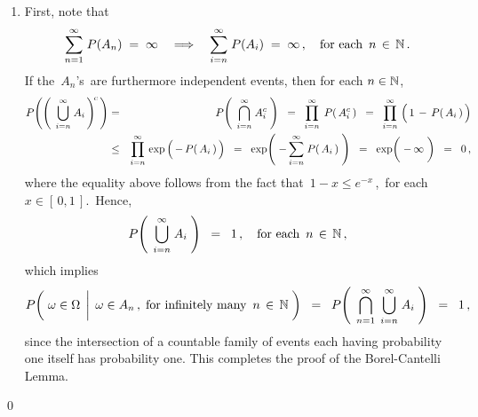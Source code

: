 \begin{enumerate}
\item
	First, note that
	\begin{equation*}
	\overset{\infty}{\underset{n=1}{\sum}}\;P(A_{n}) \; = \; \infty
	\quad\Longrightarrow\quad
		\overset{\infty}{\underset{i=n}{\sum}}\;P(A_{i}) \; = \; \infty\,,
	\quad\textnormal{for each \,$n \,\in\, \mathbb{N}$}\,.
	\end{equation*}
	If the \,$A_{n}$'s\, are furthermore independent events, then for each $n \in \mathbb{N}$,
	\begin{eqnarray*}
	P\!\left(\left(\;\,\overset{\infty}{\underset{i=n}{\bigcup}}\;A_{i}\,\right)^{\!c}\,\right)
	& = &
		P\!\left(\;\,\overset{\infty}{\underset{i=n}{\bigcap}}\;A_{i}^{c}\;\right)
		\;\; = \;\;
			\overset{\infty}{\underset{i=n}{\prod}}\;\, P\!\left(\,A_{i}^{c}\,\right)
		\;\; = \;\;
			\overset{\infty}{\underset{i=n}{\prod}}\, \left(\,\overset{{\color{white}.}}{1} \,-\, P\!\left(\,A_{i}\,\right)\,\right)
	\\
	& \leq &
		\overset{\infty}{\underset{i=n}{\prod}}\, \exp\left(\, -\,\overset{{\color{white}.}}{P}\!\left(\,A_{i}\,\right)\,\right)
		\;\; = \;\;
			\exp\!\left(\;
				-\,\overset{\infty}{\underset{i=n}{\sum}}\;\overset{{\color{white}.}}{P}\!\left(\,A_{i}\,\right)
				\;\right)
		\;\; = \;\;
			\exp\!\left(\; -\,\overset{{\color{white}\vert}}{\infty} \;\right)
		\;\; = \;\;
			0\,,
	\end{eqnarray*}
	where the equality above follows from the fact that \,$1 - x \leq e^{-x}$\,,\, for each $x \in [\,0,1\,]$.\,
	Hence,
	\begin{equation*}
	P\!\left(\;\,\overset{\infty}{\underset{i=n}{\bigcup}}\;A_{i}\;\right) \;\; = \;\; 1\,,
	\quad\textnormal{for each \,$n \,\in\, \mathbb{N}$}\,,
	\end{equation*}
	which implies
	\begin{equation*}
		P\!\left(\,
			\left.
			\omega \in \overset{{\color{white}-}}{\Omega}
			\,\;\right\vert\;
			\omega \in A_{n}\,,\;\textnormal{for infinitely many \,$n\,\in\,\N$}
			\;\right)
	\;\; = \;\;
		P\!\left(\;\,\overset{\infty}{\underset{n=1}{\bigcap}}\;\,\overset{\infty}{\underset{i=n}{\bigcup}}\;A_{i}\;\right)
	\;\; = \;\;
		1\,,
	\end{equation*}
	since the intersection of a countable family of events each having probability one itself has probability one.
	This completes the proof of the Borel-Cantelli Lemma.
\end{enumerate}
\qed


